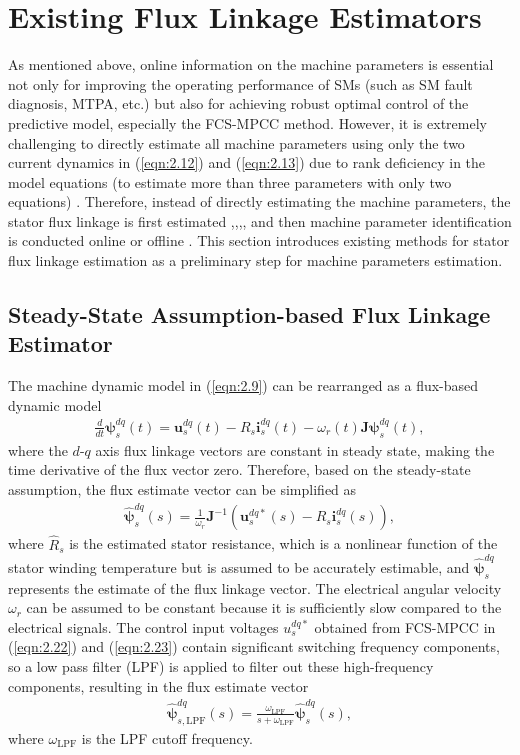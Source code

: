 \section{Existing Flux Linkage Estimators}\label{chap2:2.3} 
As mentioned above, online information on the machine parameters is essential not only for improving the operating performance of SMs (such as SM fault diagnosis, MTPA, etc.) but also for achieving robust optimal control of the predictive model, especially the FCS-MPCC method. However, it is extremely challenging to directly estimate all machine parameters using only the two current dynamics in (\ref{eqn:2.12}) and (\ref{eqn:2.13}) due to rank deficiency in the model equations (to estimate more than three parameters with only two equations) \cite{c2.3_3}. Therefore, instead of directly estimating the machine parameters, the stator flux linkage is first estimated \cite{c1_1},\cite{c2.3_4},\cite{c2.3_5},\cite{c2.3_6}, and then machine parameter identification is conducted online \cite{c2.3_1} or offline \cite{c2.3_2}. This section introduces existing methods for stator flux linkage estimation as a preliminary step for machine parameters estimation.

\subsection{Steady-State Assumption-based Flux Linkage Estimator} \label{sec2:2.3.1}
The machine dynamic model in (\ref{eqn:2.9}) can be rearranged as a flux-based dynamic model
\begin{align}\label{eqn:2.25}
\frac{d}{dt} \bm{\psi}^{dq}_s(t) = \mathbf{u}^{dq}_s(t) - R_s \mathbf{i}^{dq}_s(t) - \omega_r(t) \mathbf{J} \bm{\psi}^{dq}_s(t),
\end{align}
where the $d$-$q$ axis flux linkage vectors are constant in steady state, making the time derivative of the flux vector zero. Therefore, based on the steady-state assumption, the flux estimate vector can be simplified as
\begin{align}\label{eqn:2.26}
\bm{\hat \psi}^{dq}_s(s) = \frac{1}{\omega_r} \mathbf{J}^{-1} \left( \mathbf{u}^{dq*}_{s}(s) - \hat{R}_s \mathbf{i}^{dq}_s(s) \right),
\end{align}
where \(\hat{R}_s\) is the estimated stator resistance, which is a nonlinear function of the stator winding temperature but is assumed to be accurately estimable, and \(\bm{\hat{\psi}}^{dq}_s\) represents the estimate of the flux linkage vector. The electrical angular velocity \(\omega_r\) can be assumed to be constant because it is sufficiently slow compared to the electrical signals. The control input voltages \( u^{dq*}_{s} \) obtained from FCS-MPCC in (\ref{eqn:2.22}) and (\ref{eqn:2.23}) contain significant switching frequency components, so a low pass filter (LPF) is applied to filter out these high-frequency components, resulting in the flux estimate vector
\begin{align}\label{eqn:2.27}
\bm{\hat \psi}^{dq}_{s,\text{LPF}}(s) = \frac{\omega_\text{LPF}}{s + \omega_\text{LPF}} \bm{\hat \psi}^{dq}_s(s),
\end{align}
where \( \omega_\text{LPF} \) is the LPF cutoff frequency. 

